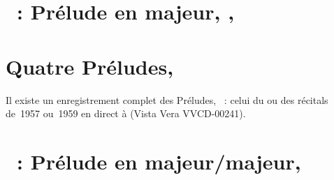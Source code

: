 \section{\ifChrono \Scriabine{}~: \fi
Prélude en \kB majeur,  , }
\label{\thesection}

\begin{workitemize}
 \item{}
 \begin{perfitemize}
  \item{}
  \item{}
  \item{}
 \end{perfitemize}
 \item{}
 \begin{perfitemize}
  \item{}
 \end{perfitemize}
 \item{}
 \begin{perfitemize}
  \item{}
 \end{perfitemize}
 \item{}
 \begin{perfitemize}
  \item\NoEdition{}
 \end{perfitemize}
\end{workitemize}

\section*{%
Quatre Préludes, }

Il existe un enregistrement complet des Préludes, ~: celui du ou
des récitals de~1957 ou~1959 en direct à \MSHM (Vista Vera VVCD-00241).

\section{\ifChrono \Scriabine{}~: \fi
Prélude en \kD \Flat majeur/\kC majeur,  }
\label{\thesection}

